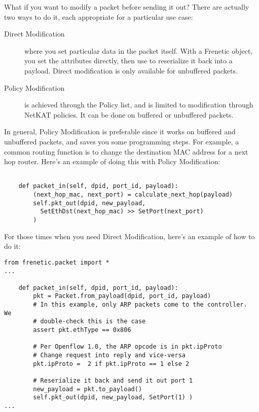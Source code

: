 What if you want to modify a packet before sending it out?  
There are actually two ways to do it, each appropriate for a particular use case:

\begin{description}
  \item[Direct Modification] where you set particular data in the packet itself.
  With a Frenetic  object, you set the attributes directly, then use
   to reserialize it back into a payload.
  Direct modification is only available for unbuffered packets.
  \item[Policy Modification] is achieved through the Policy list, and is limited to modification through NetKAT
  policies.
  It can be done on buffered or unbuffered packets.
\end{description}

In general, Policy Modification is preferable since it works on buffered and unbuffered
packets, and saves you some programming steps.
For example, a common routing function is to change the destination MAC address for a next hop router.
Here's an example of doing this with Policy Modification:

\begin{verbatim}

    def packet_in(self, dpid, port_id, payload):
        (next_hop_mac, next_port) = calculate_next_hop(payload)
        self.pkt_out(dpid, new_payload, 
          SetEthDst(next_hop_mac) >> SetPort(next_port)
        )	

\end{verbatim}

For those times when you need Direct Modification, here's an example of how to do it:

\begin{verbatim}
from frenetic.packet import *
...

    def packet_in(self, dpid, port_id, payload):
        pkt = Packet.from_payload(dpid, port_id, payload)
        # In this example, only ARP packets come to the controller.  We
        # double-check this is the case
        assert pkt.ethType == 0x806           

        # Per Openflow 1.0, the ARP opcode is in pkt.ipProto
        # Change request into reply and vice-versa
        pkt.ipProto =  2 if pkt.ipProto == 1 else 2 

        # Reserialize it back and send it out port 1
        new_payload = pkt.to_payload()
        self.pkt_out(dpid, new_payload, SetPort(1) )	
...
\end{verbatim}

